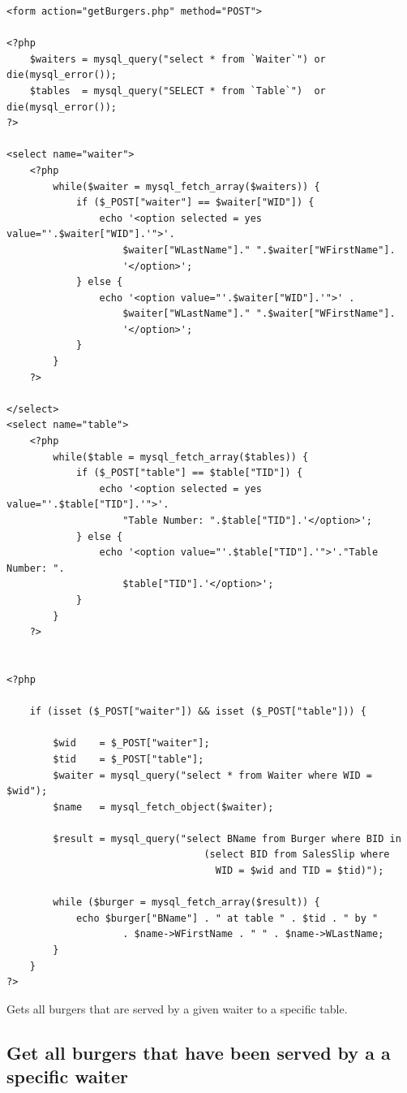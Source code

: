 \documentclass[10pt, a4paper]{article}
\begin{document}
\begin{lstlisting}[caption=getBurgers.php]
<form action="getBurgers.php" method="POST">

<?php
    $waiters = mysql_query("select * from `Waiter`") or die(mysql_error());
    $tables  = mysql_query("SELECT * from `Table`")  or die(mysql_error());
?>

<select name="waiter">
    <?php
        while($waiter = mysql_fetch_array($waiters)) {
            if ($_POST["waiter"] == $waiter["WID"]) {
                echo '<option selected = yes value="'.$waiter["WID"].'">'.
                    $waiter["WLastName"]." ".$waiter["WFirstName"].
                    '</option>';
            } else {
                echo '<option value="'.$waiter["WID"].'">' .
                    $waiter["WLastName"]." ".$waiter["WFirstName"].
                    '</option>';
            }
        }
    ?>
    
</select>
<select name="table">
    <?php
        while($table = mysql_fetch_array($tables)) {
            if ($_POST["table"] == $table["TID"]) {
                echo '<option selected = yes value="'.$table["TID"].'">'.
                	"Table Number: ".$table["TID"].'</option>';
            } else {
                echo '<option value="'.$table["TID"].'">'."Table Number: ".
                	$table["TID"].'</option>'; 
            }
        }
    ?>


<?php
    
    if (isset ($_POST["waiter"]) && isset ($_POST["table"])) {
        
        $wid    = $_POST["waiter"];
        $tid    = $_POST["table"];
        $waiter = mysql_query("select * from Waiter where WID = $wid");
        $name   = mysql_fetch_object($waiter); 
        
        $result = mysql_query("select BName from Burger where BID in 
                                  (select BID from SalesSlip where 
                                  	WID = $wid and TID = $tid)");
        
        while ($burger = mysql_fetch_array($result)) {
            echo $burger["BName"] . " at table " . $tid . " by " 
                    . $name->WFirstName . " " . $name->WLastName;
        } 
    }
?>
\end{lstlisting}
Gets all burgers that are served by a given waiter to a specific table. 

\subsection{Get all burgers that have been served by a a specific waiter}
\end{document}
